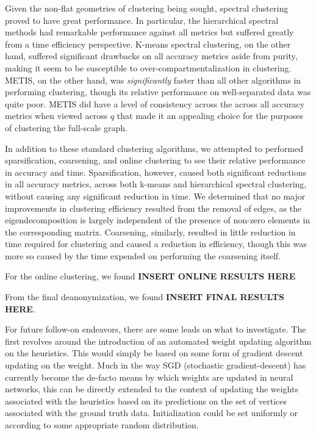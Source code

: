 \documentclass{article}
\begin{document}
Given the non-flat geometries of clustering being sought, spectral clustering proved to have great performance. In particular, the hierarchical spectral methods had remarkable performance against all metrics but suffered greatly from a time efficiency perspective. K-means spectral clustering, on the other hand, suffered significant drawbacks on all accuracy metrics aside from purity, making it seem to be susceptible to over-compartmentalization in clustering. METIS, on the other hand, was \textit{significantly} faster than all other algorithms in performing clustering, though its relative performance on well-separated data was quite poor. METIS did have a level of consistency across the across all accuracy metrics when viewed across $q$ that made it an appealing choice for the purposes of clustering the full-scale graph.

In addition to these standard clustering algorithms, we attempted to performed sparsification, coarsening, and online clustering to see their relative performance in accuracy and time. Sparsification, however, caused both significant reductions in all accuracy metrics, across both k-means and hierarchical spectral clustering, without causing any significant reduction in time. We determined that no major improvements in clustering efficiency resulted from the removal of edges, as the eigendecomposition is largely independent of the presence of non-zero elements in the corresponding matrix. Coarsening, similarly, resulted in little reduction in time required for clustering and caused a reduction in efficiency, though this was more so caused by the time expended on performing the coarsening itself.

For the online clustering, we found \textbf{INSERT ONLINE RESULTS HERE}

From the final deanonymization, we found \textbf{INSERT FINAL RESULTS HERE}.

For future follow-on endeavors, there are some leads on what to investigate. The first revolves around the introduction of an automated weight updating algorithm on the heuristics. This would simply be based on some form of gradient descent updating on the weight. Much in the way SGD (stochastic gradient-descent) has currently become the de-facto means by which weights are updated in neural networks, this can be directly extended to the context of updating the weights associated with the heuristics based on its predictions on the set of vertices associated with the ground truth data. Initialization could be set uniformly or according to some appropriate random distribution.
\end{document}
